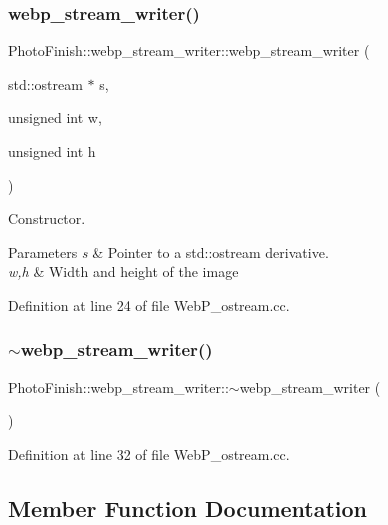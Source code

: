 \subsubsection{\texorpdfstring{webp\+\_\+stream\+\_\+writer()}{webp\_stream\_writer()}}
{\footnotesize\ttfamily Photo\+Finish\+::webp\+\_\+stream\+\_\+writer\+::webp\+\_\+stream\+\_\+writer (\begin{DoxyParamCaption}\item[{std\+::ostream $\ast$}]{s,  }\item[{unsigned int}]{w,  }\item[{unsigned int}]{h }\end{DoxyParamCaption})}



Constructor. 


\begin{DoxyParams}{Parameters}
{\em s} & Pointer to a std\+::ostream derivative. \\
\hline
{\em w,h} & Width and height of the image \\
\hline
\end{DoxyParams}


Definition at line 24 of file Web\+P\+\_\+ostream.\+cc.

\mbox{\label{class_photo_finish_1_1webp__stream__writer_a758557947da2b769223b4c19f58bf030}} 
\subsubsection{\texorpdfstring{$\sim$webp\+\_\+stream\+\_\+writer()}{~webp\_stream\_writer()}}
{\footnotesize\ttfamily Photo\+Finish\+::webp\+\_\+stream\+\_\+writer\+::$\sim$webp\+\_\+stream\+\_\+writer (\begin{DoxyParamCaption}{ }\end{DoxyParamCaption})}



Definition at line 32 of file Web\+P\+\_\+ostream.\+cc.



\subsection{Member Function Documentation}
\mbox{\label{class_photo_finish_1_1webp__stream__writer_adf78aea755773161a6147460ffd6c6cd}} 
